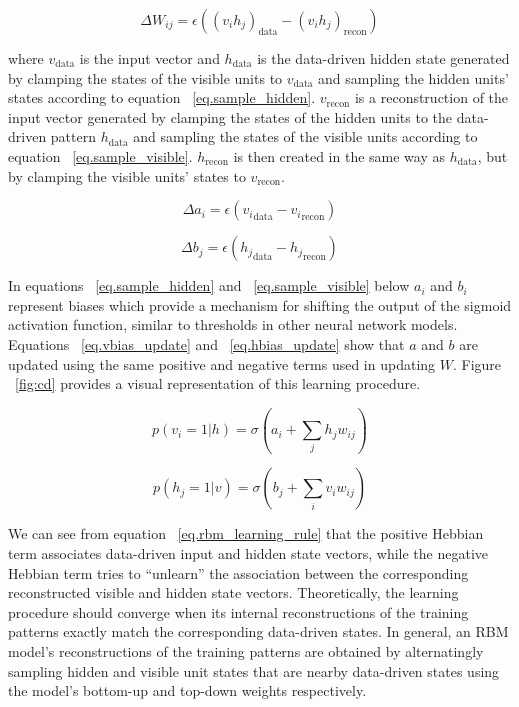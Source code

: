 \begin{equation}
\Delta W_{ij} = \epsilon((v_{i}h_{j})_{\mathrm{data}} - (v_{i}h_{j})_{\mathrm{recon}}) \label{eq.rbm_learning_rule}
\end{equation}

where $v_{\mathrm{data}}$ is the input vector and $h_{\mathrm{data}}$ is the data-driven hidden
state generated by clamping the states of the visible units to $v_{\mathrm{data}}$ 
and sampling the hidden units' states according to equation ~\ref{eq.sample_hidden}. 
$v_{\mathrm{recon}}$ is a reconstruction of the input vector generated by clamping the
states of the hidden units to the data-driven pattern $h_{\mathrm{data}}$ 
and sampling the states of the visible units according to equation ~\ref{eq.sample_visible}. 
$h_{\mathrm{recon}}$ is then created in the same way as $h_{\mathrm{data}}$, but by clamping the
visible units' states to $v_{\mathrm{recon}}$. 

\begin{equation}
\Delta a_i = \epsilon({v_i}_\mathrm{data} - {v_i}_\mathrm{recon})  \label{eq.vbias_update}
\end{equation}

\begin{equation}
\Delta b_j = \epsilon({h_j}_\mathrm{data} - {h_j}_\mathrm{recon}) \label{eq.hbias_update}
\end{equation}

In equations ~\ref{eq.sample_hidden} and ~\ref{eq.sample_visible} below 
$a_i$ and $b_i$ represent biases which provide a mechanism for shifting the output of the sigmoid activation function, 
similar to thresholds in other neural network models. 
Equations ~\ref{eq.vbias_update} and ~\ref{eq.hbias_update} show that $a$ and $b$ are 
updated using the same positive and negative terms used in updating $W$. 
Figure ~\ref{fig:cd} provides a visual representation of this 
learning procedure. 

\begin{equation}
p(v_{i}=1 | h) = \sigma (a_{i} + \sum_{j} h_{j}w_{ij}) \label{eq.sample_visible}
\end{equation} 

\begin{equation}
p(h_{j}=1 | v) = \sigma (b_{j} + \sum_{i} v_{i}w_{ij}) \label{eq.sample_hidden}
\end{equation}

We can see from equation ~\ref{eq.rbm_learning_rule}
that the positive Hebbian term 
associates data-driven input and hidden state vectors, while the negative
Hebbian term tries to  
``unlearn'' the association between the corresponding reconstructed visible and
hidden state vectors.  
Theoretically, the learning procedure should converge when its
internal reconstructions of the training patterns exactly match the
corresponding data-driven states.  
In general, an \ac{RBM} model's reconstructions of the training patterns are
obtained by alternatingly sampling hidden and visible unit states that 
are nearby data-driven states using the model's bottom-up and top-down weights respectively. 

